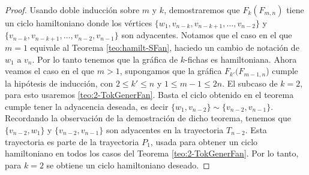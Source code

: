     \begin{proof}
        Usando doble inducci\'on sobre $m$ y $k$, demostraremos que
        $F_k(F_{m,n})$ tiene un ciclo hamiltoniano donde los v\'ertices $\{w_1,
        v_{n-k}, v_{n-k+1}, \dots, v_{n-2}\}$ y $\{v_{n-k}, v_{n-k+1}, \dots,
        v_{n-2}, v_{n-1}\}$ son adyacentes. Notamos que el caso en el que $m =1$
        equivale al Teorema \ref{teo:hamilt-SFan}, haciedo un cambio de
        notaci\'on de $w_1$ a $v_n$. Por lo tanto tenemos que la gr\'afica de
        $k$-fichas es hamiltoniana. Ahora veamos el caso en el que $m>1$,
        supongamos que la gr\'afica $F_{k'}(F_{m-1,n}$) cumple la hip\'otesis de
        inducci\'on, con $2\leq k'\leq n$ y $1 \leq m-1 \leq 2n$. El subcaso de
        $k=2$, para esto usaremos \cref{teo:2-TokGenerFan}. Basta el ciclo
        obtenido en el teorema cumple tener la adyacencia deseada, es decir
        $\{w_1, v_{n-2}\}\sim\{v_{n-2}, v_{n-1}\}$. Recordando la observaci\'on
        de la demostraci\'on de dicho teorema, tenemos que $\{v_{n-2},w_1\}$ y
        $\{v_{n-2},v_{n-1}\}$ son adyacentes en la trayectoria $T_{n-2}$. Esta
        trayectoria es parte de la trayectoria $P_1$, usada para obtener un
        ciclo hamiltoniano en todos los casos del Teorema
        \ref{teo:2-TokGenerFan}. Por lo tanto, para $k=2$ se obtiene un ciclo
        hamiltoniano deseado.


\end{proof}
